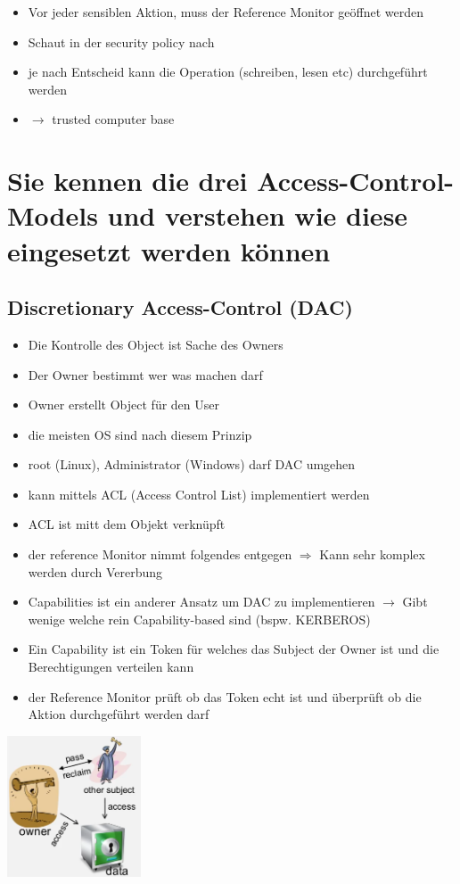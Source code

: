 \documentclass{report}
\newenvironment{Figure}
	{\par\medskip\noindent\minipage{\linewidth}}
	{\endminipage\par\medskip}
\theoremstyle{definition}
\theoremstyle{example}
\begin{document}
\begin{itemize}
	\item Vor jeder sensiblen Aktion, muss der Reference Monitor geöffnet werden
	\item Schaut in der security policy nach
	\item je nach Entscheid kann die Operation (schreiben, lesen etc) durchgeführt werden
	\item $\rightarrow$ trusted computer base
\end{itemize}



\section{Sie kennen die drei Access-Control-Models und verstehen wie diese eingesetzt werden können}

	\subsection{Discretionary Access-Control (DAC)}
\begin{itemize}
	\item Die Kontrolle des Object ist Sache des Owners
	\item Der Owner bestimmt wer was machen darf
	\item Owner erstellt Object für den User
	\item die meisten OS sind nach diesem Prinzip
	\item root (Linux), Administrator (Windows) darf DAC umgehen
	\item kann mittels ACL (Access Control List) implementiert werden
	\item ACL ist mitt dem Objekt verknüpft
	\item der reference Monitor nimmt folgendes entgegen  $\Rightarrow$ Kann sehr komplex werden durch Vererbung
	\item Capabilities ist ein anderer Ansatz um DAC zu implementieren $\rightarrow$ Gibt wenige welche rein Capability-based sind (bspw. KERBEROS)
	\item Ein Capability ist ein Token für welches das Subject der Owner ist und die Berechtigungen verteilen kann
	\item der Reference Monitor prüft ob das Token echt ist und überprüft ob die Aktion durchgeführt werden darf
\end{itemize}
\begin{Figure}
\centering
\includegraphics[width=150px]{img/DAC.png}
	\label{fig:Abbildung DAC}
\end{Figure}
\end{document}
